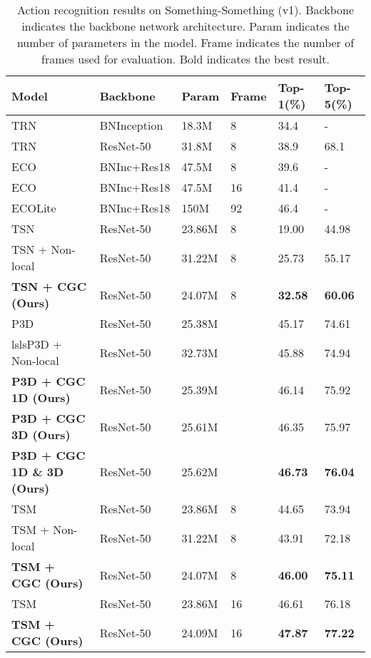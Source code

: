\documentclass[runningheads]{llncs}
\begin{document}
\begin{table*}[t]
\caption{Action recognition results on Something-Something (v1). Backbone indicates the backbone network architecture. Param indicates the number of parameters in the model. Frame indicates the number of frames used for evaluation. Bold indicates the best result.}
\label{tab:sth}
\begin{center}
\tiny
\begin{tabular}{llllll}
\hline
Model  & Backbone & Param  & Frame & Top-1(\%) & Top-5(\%) 
\\ \hline 
TRN~\cite{zhou2018temporal} & BNInception         & 18.3M & 8 & 34.4 & - \\ 
TRN~\cite{lin2018temporal} & ResNet-50          & 31.8M & 8 & 38.9 & 68.1 \\ 
ECO~\cite{zolfaghari2018eco} & BNInc+Res18  & 47.5M & 8 & 39.6 &- \\
ECO~\cite{zolfaghari2018eco} & BNInc+Res18 & 47.5M & 16 & 41.4 &- \\
ECOLite~\cite{zolfaghari2018eco} & BNInc+Res18 & 150M & 92 & 46.4 &- \\
\hline \hline
TSN~\cite{TSN} & ResNet-50         & 23.86M & 8 & 19.00 & 44.98 \\ 
TSN + Non-local~\cite{wang2017non} & ResNet-50         & 31.22M & 8 & 25.73 & 55.17 \\ 
\textbf{TSN + CGC (Ours)} & ResNet-50         & 24.07M & 8 & \textbf{32.58} &  \textbf{60.06} \\
\hline
P3D~\cite{qiu2017learning} & ResNet-50         & 25.38M &  & 45.17 & 74.61 \\ 
lslsP3D + Non-local~\cite{wang2017non} & ResNet-50         & 32.73M &  & 45.88 & 74.94 \\ 
\textbf{P3D + CGC 1D (Ours)} & ResNet-50         & 25.39M &  & 46.14 & 75.92 \\
\textbf{P3D + CGC 3D (Ours)} & ResNet-50         & 25.61M &  & 46.35 &  75.97 \\
\textbf{P3D + CGC 1D \& 3D (Ours)} & ResNet-50         & 25.62M &  & \textbf{46.73} &  \textbf{76.04} \\
\hline
TSM~\cite{lin2018temporal} & ResNet-50         & 23.86M & 8 & 44.65 & 73.94 \\ 
TSM + Non-local~\cite{wang2017non} & ResNet-50         & 31.22M & 8 & 43.91 & 72.18 \\ 
\textbf{TSM + CGC (Ours)} & ResNet-50         & 24.07M & 8 & \textbf{46.00} &  \textbf{75.11} \\
\hline
TSM~\cite{lin2018temporal} & ResNet-50         & 23.86M & 16 & 46.61 & 76.18 \\ 
\textbf{TSM + CGC (Ours)} & ResNet-50         & 24.09M & 16 & \textbf{47.87} &  \textbf{77.22} \\
\hline
\end{tabular}
\end{center}

\end{table*}
\end{document}
